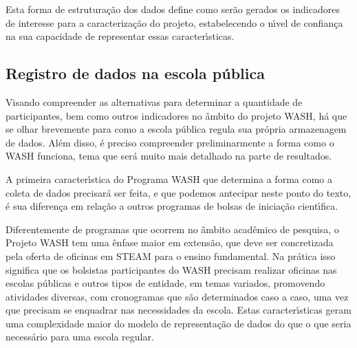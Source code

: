\documentclass[
12pt,		%
openright,	%
twoside,  %
a4paper,			%
chapter=TITLE,		%
english,			%
french,				%
spanish,			%
brazil				%
]{USPSC-classe/USPSC}
\begin{document}
Esta forma de estrutura\c{c}\~ao dos dados define como ser\~ao gerados os indicadores de interesse para a caracteriza\c{c}\~ao do projeto, estabelecendo o n\'{\i}vel de confian\c{c}a na sua capacidade de representar essas caracter\'{\i}sticas.














\subsection[Registro de dados na escola p\'ublica]{Registro de dados na escola p\'ublica}\label{Registro de dados na escola p\'ublica}
Visando compreender as alternativas para determinar a quantidade de participantes, bem como outros indicadores no \^ambito do projeto WASH, h\'a que se olhar brevemente para como a escola p\'ublica regula sua pr\'opria armazenagem de dados. Al\'em disso, \'e preciso compreender preliminarmente a forma como o WASH funciona, tema que ser\'a muito mais detalhado na parte de resultados.














A primeira caracter\'{\i}stica do Programa WASH que determina a forma como a coleta de dados precisar\'a ser feita, e que podemos antecipar neste ponto do texto, \'e sua diferen\c{c}a em rela\c{c}\~ao a outros programas de bolsas de inicia\c{c}\~ao cient\'{\i}fica.














Diferentemente de programas que ocorrem no \^ambito acad\^emico de pesquisa, o Projeto WASH tem uma \^enfase maior em extens\~ao, que deve ser concretizada pela oferta de oficinas em STEAM para o ensino fundamental. Na pr\'atica isso significa que os bolsistas participantes do WASH precisam realizar oficinas nas escolas p\'ublicas e outros tipos de entidade, em temas variados, promovendo atividades diversas, com cronogramas que s\~ao determinados caso a caso, uma vez que precisam se enquadrar nas necessidades da escola. Estas caracter\'{\i}sticas geram uma complexidade maior do modelo de representa\c{c}\~ao de dados do que o que seria necess\'ario para uma escola regular.
\end{document}
